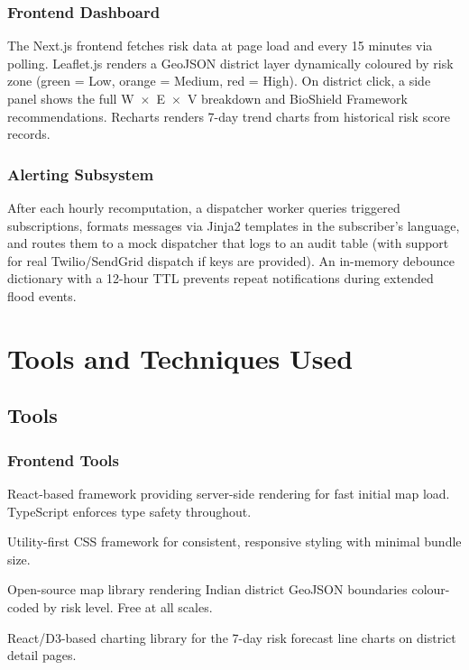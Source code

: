 \documentclass[12pt,a4paper]{report}
\begin{document}
\subsection{Frontend Dashboard}

The Next.js frontend fetches risk data at page load and every 15 minutes via polling. Leaflet.js renders a GeoJSON district layer dynamically coloured by risk zone (green = Low, orange = Medium, red = High). On district click, a side panel shows the full W~$\times$~E~$\times$~V breakdown and BioShield Framework recommendations. Recharts renders 7-day trend charts from historical risk score records.

\subsection{Alerting Subsystem}

After each hourly recomputation, a dispatcher worker queries triggered subscriptions, formats messages via Jinja2 templates in the subscriber's language, and routes them to a mock dispatcher that logs to an audit table (with support for real Twilio/SendGrid dispatch if keys are provided). An in-memory debounce dictionary with a 12-hour TTL prevents repeat notifications during extended flood events.

\chapter{Tools and Techniques Used}

\section{Tools}

\subsection{Frontend Tools}

\begin{description}[style=nextline, leftmargin=3cm]
  \item[Next.js 14] React-based framework providing server-side rendering for fast initial map load. TypeScript enforces type safety throughout.
  \item[TailwindCSS] Utility-first CSS framework for consistent, responsive styling with minimal bundle size.
  \item[Leaflet.js] Open-source map library rendering Indian district GeoJSON boundaries colour-coded by risk level. Free at all scales.
  \item[Recharts] React/D3-based charting library for the 7-day risk forecast line charts on district detail pages.
\end{description}
\end{document}
